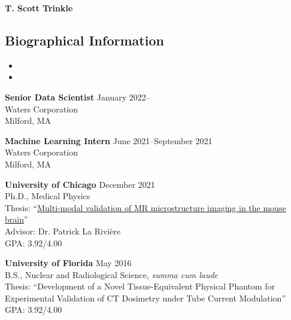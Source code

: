 \documentclass[10pt,letterpaper]{article}
\begin{document}
\begin{center}
{\LARGE \textbf{T. Scott Trinkle}}\\
\end{center}
\vspace{-1em}

\subsection*{Biographical Information}
\begin{itemize}[noitemsep]
\item[]  
\item[]  
\end{itemize}

\begin{benumerate}{2}
\item
  \textbf{Senior Data Scientist} \hfill January 2022--\\
  Waters Corporation\\
  Milford, MA

\item
  \textbf{Machine Learning Intern} \hfill June 2021--September 2021\\
  Waters Corporation\\
  Milford, MA
\end{benumerate}

\begin{benumerate}{2}
\item
  \textbf{University of Chicago} \hfill December 2021\\
  Ph.D., Medical Physics\\
  Thesis: ``\href{https://www.proquest.com/openview/5ce6c9b022b339d81e3cd47cc0cdf8fa/1?pq-origsite=gscholar&cbl=18750&diss=y}{Multi-modal validation of MR microstructure imaging in the mouse brain}''\\
  Advisor: Dr. Patrick La Rivi\`ere \\
  GPA: 3.92/4.00\\
\item
  \textbf{University of Florida} \hfill May 2016\\
  B.S., Nuclear and Radiological Science, \textit{summa cum laude}\\
  Thesis: ``Development of a Novel Tissue-Equivalent Physical Phantom for Experimental Validation
  of CT Dosimetry under Tube Current Modulation''\\ 
  GPA: 3.92/4.00\\
\end{benumerate}
\end{document}
